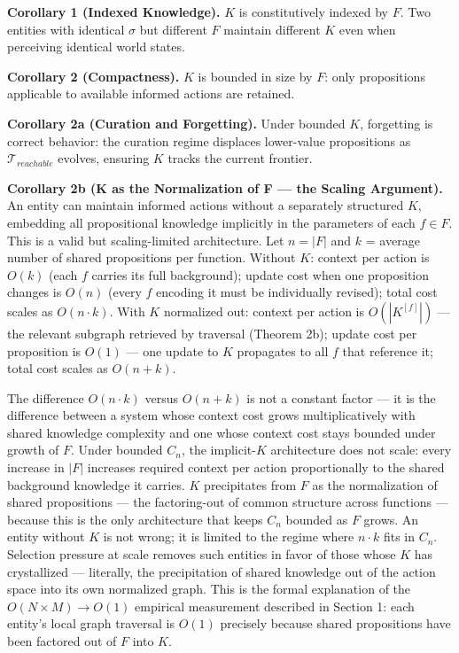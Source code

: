 \documentclass[
]{article}
\begin{document}
\textbf{Corollary 1 (Indexed Knowledge).} \(K\) is constitutively
indexed by \(F\). Two entities with identical \(\sigma\) but different
\(F\) maintain different \(K\) even when perceiving identical world
states.

\textbf{Corollary 2 (Compactness).} \(K\) is bounded in size by \(F\):
only propositions applicable to available informed actions are retained.

\textbf{Corollary 2a (Curation and Forgetting).} Under bounded \(K\),
forgetting is correct behavior: the curation regime displaces
lower-value propositions as \(\mathcal{T}_{reachable}\) evolves,
ensuring \(K\) tracks the current frontier.

\textbf{Corollary 2b (K as the Normalization of F --- the Scaling
Argument).} An entity can maintain informed actions without a separately
structured \(K\), embedding all propositional knowledge implicitly in
the parameters of each \(f \in F\). This is a valid but scaling-limited
architecture. Let \(n = |F|\) and \(k\) = average number of shared
propositions per function. Without \(K\): context per action is \(O(k)\)
(each \(f\) carries its full background); update cost when one
proposition changes is \(O(n)\) (every \(f\) encoding it must be
individually revised); total cost scales as \(O(n \cdot k)\). With \(K\)
normalized out: context per action is \(O(|K^{[f]}|)\) --- the relevant
subgraph retrieved by traversal (Theorem 2b); update cost per
proposition is \(O(1)\) --- one update to \(K\) propagates to all \(f\)
that reference it; total cost scales as \(O(n + k)\).

The difference \(O(n \cdot k)\) versus \(O(n + k)\) is not a constant
factor --- it is the difference between a system whose context cost
grows multiplicatively with shared knowledge complexity and one whose
context cost stays bounded under growth of \(F\). Under bounded \(C_n\),
the implicit-\(K\) architecture does not scale: every increase in
\(|F|\) increases required context per action proportionally to the
shared background knowledge it carries. \(K\) precipitates from \(F\) as
the normalization of shared propositions --- the factoring-out of common
structure across functions --- because this is the only architecture
that keeps \(C_n\) bounded as \(F\) grows. An entity without \(K\) is
not wrong; it is limited to the regime where \(n \cdot k\) fits in
\(C_n\). Selection pressure at scale removes such entities in favor of
those whose \(K\) has crystallized --- literally, the precipitation of
shared knowledge out of the action space into its own normalized graph.
This is the formal explanation of the \(O(N \times M) \to O(1)\)
empirical measurement described in Section 1: each entity's local graph
traversal is \(O(1)\) precisely because shared propositions have been
factored out of \(F\) into \(K\).
\end{document}
